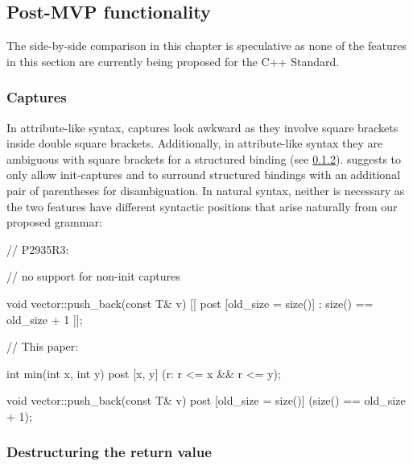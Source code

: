 \subsection{Post-MVP functionality}

The side-by-side comparison in this chapter is speculative as none of the features in this section are currently being proposed for the C++ Standard.

\subsubsection{Captures}
\label{subsubsec:comp_captures}

In attribute-like syntax, captures look awkward as they involve square brackets inside double square brackets. Additionally, in attribute-like syntax they are ambiguous with square brackets for a structured binding (see \ref{subsubsec:struct}). \cite{P2935R3} suggests to only allow init-captures and to surround structured bindings with an additional pair of parentheses for disambiguation. In natural syntax, neither is necessary as the two features have different syntactic positions that arise naturally from our proposed grammar:

\begin{minipage}[t]{8cm}
\begin{codeblock}
// P2935R3:

// no support for non-init captures


void vector::push_back(const T& v)
  [[ post [old_size = size()]
    : size() == old_size + 1 ]];
    
\end{codeblock}
\end{minipage}
\begin{minipage}[t]{8cm}
\begin{codeblock}
// This paper:
    
int min(int x, int y)
  post [x, y] (r: r <= x && r <= y);
  
void vector::push_back(const T& v)
  post [old_size = size()] 
    (size() == old_size + 1);
\end{codeblock}
\end{minipage}


\subsubsection{Destructuring the return value}
\label{subsubsec:struct}

